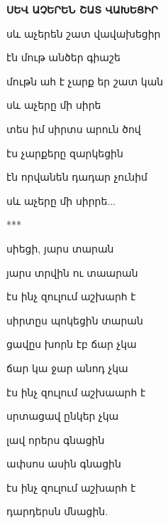                                    



                    

            { \bf  {ՍԵՎ ԱՉԵՐԵՆ ՇԱՏ ՎԱԽԵՑԻՐ}      }



            սև աչերեն  շատ վավախեցիր


            էն մութ  անծեր գիաշե

            մութն ահ է չարք եր շատ կան


            սև աչերը մի սիրե


            տես իմ սիրտս  արուն ծով

            էս չարքերը   զարկեցին


           էն որվանեն դադար չունիմ


           սև աչերը մի սիրրե...
                                   
            \centerline{***}



            սիեցի, յարս  տարան

            յարս տրվին ու տաարան


            էս ինչ զուլում աշխարհ է


            սիրտըս պոկեցին տարան

            ցավըս խորն էբ ճար չկա

            ճար կա ջար անոդ չկա


            էս ինչ զուլում աշխաարհ է


            սրտացավ ընկեր չկա


            լավ որերս գնացին

            ափսոս ասին գնացին


            էս ինչ զուլում աշխարհ է

              դարդերսն մնացին.





